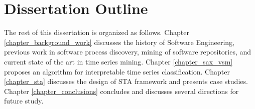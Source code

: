 \section{Dissertation Outline}\label{section_organization}
The rest of this dissertation is organized as follows. Chapter \ref{chapter_background_work} discusses the history 
of Software Engineering, previous work in software process discovery, mining of software repositories, and current 
state of the art in time series mining. Chapter \ref{chapter_sax_vsm} proposes an algorithm for interpretable 
time series classification. Chapter \ref{chapter_sta} discusses the design of STA framework and presents case studies.
Chapter \ref{chapter_conclusions} concludes and discusses several directions for future study.